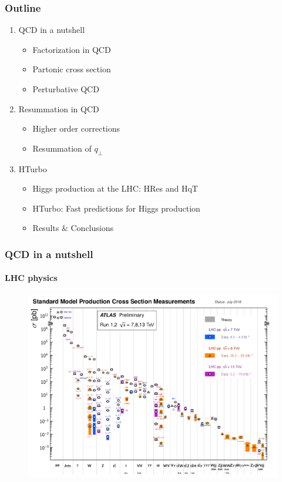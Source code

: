 \documentclass[aspectratio=43]{beamer}
\begin{document}
\begin{frame}

	\frametitle{Outline}
	
	\begin{enumerate}
		\item {\color{blue}QCD in a nutshell}
		\begin{itemize}
			\item Factorization in QCD
			\item Partonic cross section
			\item Perturbative QCD
		\end{itemize}
		\item {\color{blue}Resummation in QCD}
		\begin{itemize}
			\item Higher order corrections
			\item Resummation of $q_{\perp}$
		\end{itemize}
		\item {\color{blue}HTurbo}
		\begin{itemize}
			\item Higgs production at the LHC: HRes and HqT
			\item HTurbo: Fast predictions for Higgs production
			\item Results $\&$ Conclusions
		\end{itemize}
	\end{enumerate}
	
\end{frame}

\begin{frame}


\end{frame}

\begin{frame}

	\frametitle{QCD in a nutshell}
	\framesubtitle{LHC physics}
	
	\begin{figure}
		\includegraphics[width = 9.5 cm]{plots/lhc_measurements.png}
	\end{figure}

\end{frame}
\end{document}
